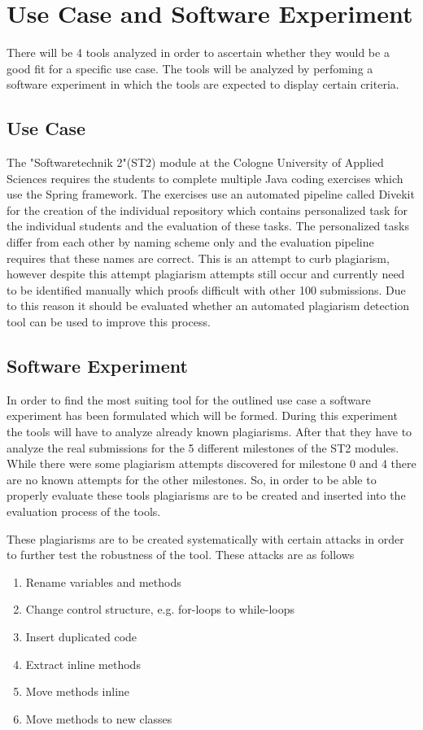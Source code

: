 \documentclass[a4paper, 11pt]{article}
\renewcommand{\\}{\vspace*{0.5\baselineskip} \newline}
\begin{document}
\clearpage

\section{Use Case and Software Experiment}

There will be 4 tools analyzed in order to ascertain whether they would be a good fit for a specific use case. The tools will be analyzed by perfoming
a software experiment in which the tools are expected to display certain criteria.

\subsection{Use Case}

The "Softwaretechnik 2"(ST2) module at the Cologne University of Applied Sciences requires the students to complete multiple Java coding exercises which
use the Spring framework. The exercises use an automated pipeline called Divekit for the creation of the individual repository which contains personalized task for the
individual students and the evaluation of these tasks. The personalized tasks differ from each other by naming scheme only and the evaluation pipeline
requires that these names are correct. This is an attempt to curb plagiarism, however despite this attempt plagiarism attempts still occur and currently
need to be identified manually which proofs difficult with other 100 submissions. Due to this reason it should be evaluated whether an automated plagiarism
detection tool can be used to improve this process.

\subsection{Software Experiment}

In order to find the most suiting tool for the outlined use case a software experiment has been formulated which will be formed. During this experiment
the tools will have to analyze already known plagiarisms. After that they have to analyze the real submissions for the 5 different milestones of the
ST2 modules. While there were some plagiarism attempts discovered for milestone 0 and 4 there are no known attempts for the other milestones. So, in order
to be able to properly evaluate these tools plagiarisms are to be created and inserted into the evaluation process of the tools.

These plagiarisms are to be created systematically with certain attacks in order to further test the robustness of the tool. These attacks are as follows
\begin{enumerate}
	\item Rename variables and methods
	\item Change control structure, e.g. for-loops to while-loops
	\item Insert duplicated code
	\item Extract inline methods
	\item Move methods inline
	\item Move methods to new classes
\end{enumerate}
\end{document}
